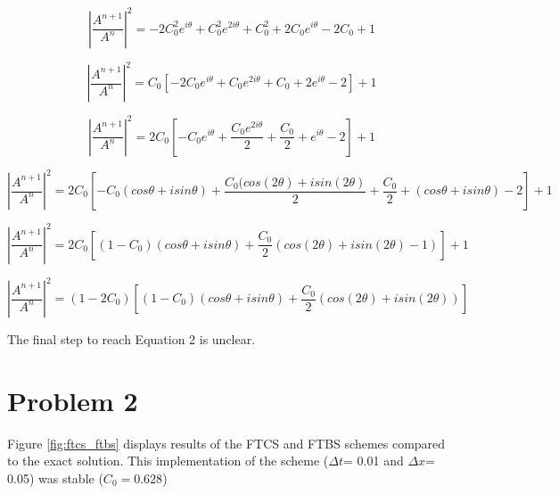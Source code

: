 \documentclass[12pt]{article}
\begin{document}
	\begin{equation}
		|\frac{A^{n+1}}{A^n}|^2 = -2C_0^2e^{i\theta} + C_0^2e^{2i\theta} + C_0^2 + 2C_0e^{i\theta}-2C_0 + 1
	\end{equation}
	
	\begin{equation}
		|\frac{A^{n+1}}{A^n}|^2 = C_0[-2C_0e^{i\theta} + C_0e^{2i\theta} + C_0 + 2e^{i\theta}-2] + 1
	\end{equation}
	
	\begin{equation}
		|\frac{A^{n+1}}{A^n}|^2 = 2C_0[-C_0e^{i\theta} + \frac{C_0e^{2i\theta}}{2} + \frac{C_0}{2} + e^{i\theta}-2] + 1
	\end{equation}
	
	\begin{equation}
		|\frac{A^{n+1}}{A^n}|^2 = 2C_0[-C_0(cos\theta + isin\theta) + \frac{C_0(cos(2\theta) + isin(2\theta)}{2} + \frac{C_0}{2} + (cos\theta + isin\theta)-2] + 1
	\end{equation}
	
	\begin{equation}
		|\frac{A^{n+1}}{A^n}|^2 = 2C_0[(1-C_0)(cos\theta + isin\theta) + \frac{C_0}{2}(cos(2\theta) + isin(2\theta) -1)] + 1
	\end{equation}
	
	\begin{equation}
		|\frac{A^{n+1}}{A^n}|^2 = (1-2C_0)[(1-C_0)(cos\theta + isin\theta) + \frac{C_0}{2}(cos(2\theta) + isin(2\theta))]
	\end{equation}
	
	The final step to reach Equation 2 is unclear.
		

	

	

	
	
	
		
	\section{Problem 2}
	
	\noindent Figure \ref{fig:ftcs_ftbs} displays results of the FTCS and FTBS schemes compared to the exact solution. This implementation of the scheme ($\Delta t$= 0.01 and $\Delta x$= 0.05) was stable ($C_0=0.628$)
	
\end{document}
